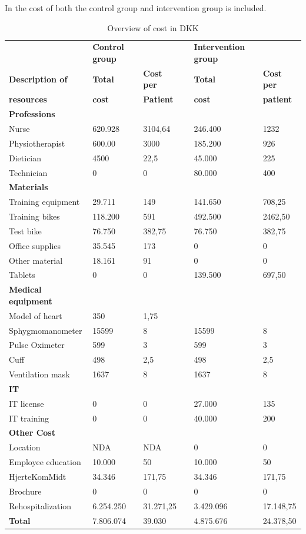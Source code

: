 In  the cost of both the control group and intervention group is included.
\begin{table} [H]
\begin{tabular}{llllll}
\hline
& \textbf{Control group} &  & & \textbf{Intervention group} \\
\cline{2-3} \cline{5-6}
\textbf{Description of} \quad & \textbf{Total} & \textbf{Cost per}  & &\textbf{Total} & \textbf{Cost per} \\
\textbf{resources}& \textbf{cost} & \textbf{Patient} & & \textbf{cost} & \textbf{patient}\\
\hline
\textbf{Professions}      & & &    &      \\
Nurse      & 620.928 & 3104,64   & & 246.400        & 1232       \\
Physiotherapist  & 600.00 & 3000 &  & 185.200     & 926     \\
Dietician  & 4500   & 22,5   &  & 45.000 & 225     \\
Technician & 0      & 0  &  & 80.000 & 400  \\
\textbf{Materials} & & \\
Training equipment & 29.711 & 149 && 141.650 & 708,25\\
Training bikes & 118.200  & 591 & & 492.500 & 2462,50 \\
Test bike & 76.750 & 382,75 && 76.750 & 382,75\\
Office supplies & 35.545 & 173 && 0& 0 \\
Other material & 18.161 & 91 && 0 & 0\\
Tablets & 0 & 0 && 139.500 & 697,50\\
\textbf{Medical equipment} & & & &\\
Model of heart & 350 & 1,75 & &&\\
Sphygmomanometer & 15599 & 8& & 15599 & 8\\
Pulse Oximeter & 599 & 3 && 599 & 3\\
Cuff & 498 & 2,5 && 498 & 2,5\\
Ventilation mask & 1637 & 8 && 1637 & 8\\
\textbf{IT} & & & &\\
IT license & 0 & 0 & &27.000 & 135\\
IT training & 0 & 0 & &40.000 & 200\\
\textbf{Other Cost} & & & &\\
Location & NDA & NDA & &0 & 0 \\
Employee education & 10.000 & 50 & &10.000 & 50\\
HjerteKomMidt & 34.346 & 171,75 && 34.346 & 171,75\\
Brochure & 0&0 &&0 &0\\
Rehospitalization & 6.254.250 & 31.271,25 & &3.429.096 & 17.148,75\\ \hline\hline
\textbf{Total} & 7.806.074 & 39.030 && 4.875.676 & 24.378,50 \\
\hline
\end{tabular}
\caption{Overview of cost in DKK}
\label{tab: allinone}
\end{table}

